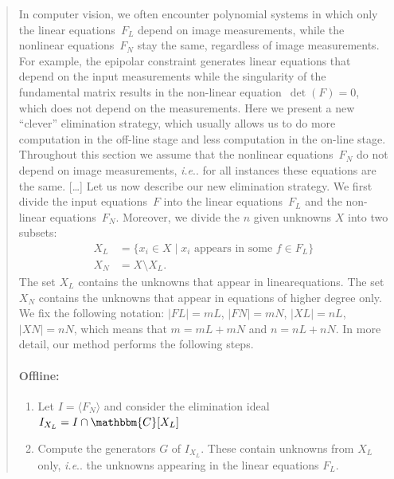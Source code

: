 \documentclass[11pt,a4paper]{article}
\makeatletter
\theoremstyle{definition}
\newcommand{\C}{\ensuremath{\mathbbm{C}}}
\DeclareRobustCommand\ie{\emph{i.e}\@ifnextchar.{}{.\@}}
\makeatother
\begin{document}
\begin{quote}
In computer vision, we often encounter polynomial systems in which only the linear equations~$F_L$
depend on image measurements, while the nonlinear equations~$F_N$ stay the same, regardless of
image measurements. For example, the epipolar constraint generates linear equations that depend
on the input measurements while the singularity of the fundamental matrix results in the non-linear
equation~$\det(F) = 0$, which does not depend on the measurements. Here we present a new ``clever''
elimination strategy, which usually allows us to do more computation in the off-line stage and less
computation in the on-line stage.
Throughout this section we assume that the nonlinear equations~$F_N$ do not depend on image
measurements, \ie{} for all instances these equations are the same.
[\ldots]
Let us now describe our new elimination strategy. We first divide the input equations~$F$ into the
linear equations~$F_L$ and the non-linear equations~$F_N$. Moreover, we divide the $n$ given unknowns
$X$ into two subsets:
\begin{equation}
    \begin{aligned}
        X_L &= \{x_i\in X\;|\;x_i\text{ appears in some }f\in F_L\}\\
        X_N &= X\setminus X_L.
    \end{aligned}
\end{equation}
The set $X_L$ contains the unknowns that appear in linearequations. The set $X_N$ contains the
unknowns that appear in equations of higher degree only. We fix the following notation:
$|FL|=mL$, $|FN|=mN$, $|XL|=nL$, $|XN|=nN$, which means that $m=mL+mN$ and $n=nL+nN$.
In more detail, our method performs the following steps.
\paragraph{Offline:}
\begin{enumerate}
    \item Let $I = \langle F_N \rangle$ and consider the elimination
    ideal~$I_{X_L}=I\cap \C[X_L]$
    \item Compute the generators $G$ of $I_{X_L}$. These contain unknowns from $X_L$ only, \ie{}
    the unknowns appearing in the linear equations $F_L$.
\end{enumerate}

\end{quote}
\end{document}
